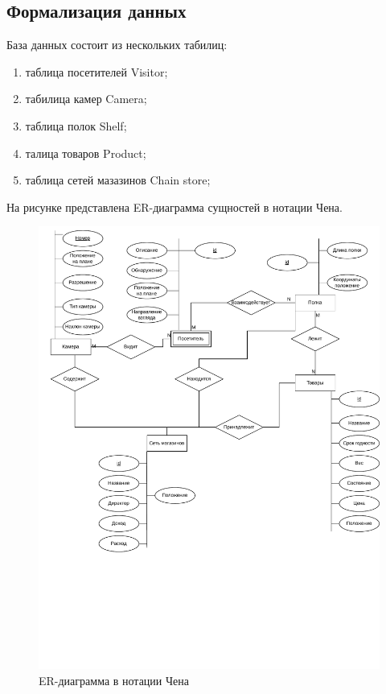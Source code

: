 \subsection{Формализация данных}

База данных состоит из нескольких табилиц:

\begin{enumerate}[label=\arabic*.]
	\item таблица посетителей Visitor;
	\item табилица камер Camera;
	\item таблица полок Shelf;
	\item талица товаров Product;
	\item таблица сетей мазазинов Chain store;
\end{enumerate}

На рисунке представлена ER-диаграмма сущностей в нотации Чена.

\begin{figure}[ht!]
	\centering
	\includegraphics[width=0.9\linewidth]{assets/images/ER.drawio.pdf}
	\caption{ER-диаграмма в нотации Чена}
	\label{fig:anal:chen}
\end{figure}
\FloatBarrier

